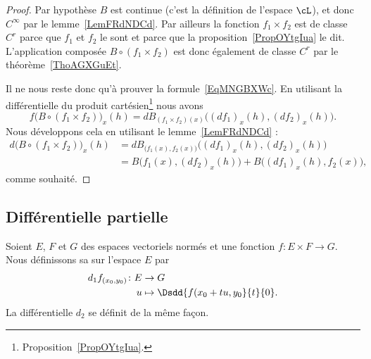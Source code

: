\begin{proof}
    Par hypothèse \( B\) est continue (c'est la définition de l'espace \( \cL\)), et donc \(  C^{\infty}\) par le lemme~\ref{LemFRdNDCd}. Par ailleurs la fonction \( f_1\times f_2\) est de classe \( C^r\) parce que \( f_1\) et \( f_2\) le sont et parce que la proposition~\ref{PropOYtgIua} le dit. L'application composée \( B\circ(f_1\times f_2)\) est donc également de classe \( C^r\) par le théorème~\ref{ThoAGXGuEt}.

    Il ne nous reste donc qu'à prouver la formule~\ref{EqMNGBXWc}. En utilisant la différentielle du produit cartésien\footnote{Proposition~\ref{PropOYtgIua}.} nous avons
    \begin{equation}
        f\big( B\circ(f_1\times f_2) \big)_x(h)=dB_{(f_1\times f_2)(x)}\big( (df_1)_x(h),(df_2)_x(h) \big).
    \end{equation}
    Nous développons cela en utilisant le lemme~\ref{LemFRdNDCd} :
    \begin{subequations}
        \begin{align}
        d\big( B\circ(f_1\times f_2) \big)_x(h)&=dB_{\big( f_1(x),f_2(x) \big)}\big( (df_1)_x(h),(df_2)_x(h) \big)\\
        &=B\big( f_1(x),(df_2)_x(h) \big)+B\big( (df_1)_x(h),f_2(x) \big),
        \end{align}
    \end{subequations}
    comme souhaité.
\end{proof}

\subsection{Différentielle partielle}

\begin{definition}    \label{VJM_CtSKT}
    Soient \( E\), \( F\) et \( G\) des espaces vectoriels normés et une fonction \( f\colon E\times F\to G\). Nous définissons sa  sur l'espace \( E\) par
    \begin{equation}
        \begin{aligned}
            d_1f_{(x_0,y_0)}\colon E&\to G \\
            u&\mapsto \Dsdd{ f(x_0+tu,y_0 }{t}{0} .
        \end{aligned}
    \end{equation}
    La différentielle \( d_2\) se définit de la même façon.
\end{definition}

